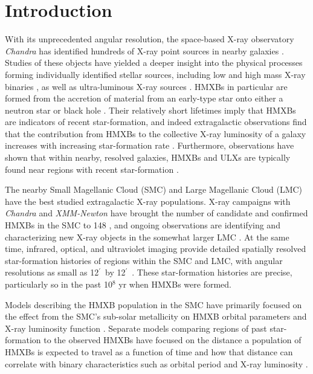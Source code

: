 \documentclass[usenatbib]{mnras}
\newcommand{\amin}{\ifmmode {^{\prime}\ }\else$^{\prime}$\fi}
\begin{document}
\section{Introduction}
With its unprecedented angular resolution, the space-based X-ray observatory {\it Chandra} has identified hundreds of X-ray point sources in nearby galaxies \citep{sarazin01,ho01,fabbiano01,fabbiano06}. Studies of these objects have yielded a deeper insight into the physical processes forming individually identified stellar sources, including low and high mass X-ray binaries \citep[LMXBs and HMXBs, respectively;][]{lehmer10}, as well as ultra-luminous X-ray sources \citep[ULX;][]{swartz04,feng11}. HMXBs in particular are formed from the accretion of material from an early-type star onto either a neutron star or black hole \citep[for a review, see][]{bhattacharya91}. Their relatively short lifetimes imply that HMXBs are indicators of recent star-formation, and indeed extragalactic observations find that the contribution from HMXBs to the collective X-ray luminosity of a galaxy increases with increasing star-formation rate \citep{grimm03,lehmer10,mineo12}. Furthermore, observations have shown that within nearby, resolved galaxies, HMXBs and ULXs are typically found near regions with recent star-formation \citep{zezas02a, kaaret04, antoniou10}.


The nearby Small Magellanic Cloud (SMC) and Large Magellanic Cloud (LMC) have the best studied extragalactic X-ray populations. X-ray campaigns with {\it Chandra} \citep[e.g.,][]{laycock10} and {\it XMM-Newton} \citep[e.g.,][]{sturm13} have brought the number of candidate and confirmed HMXBs in the SMC to 148 \citep[for the most recent catalog, see][]{haberl16}, and ongoing observations are identifying and characterizing new X-ray objects in the somewhat larger LMC \citep{antoniou16}. At the same time, infrared, optical, and ultraviolet imaging provide detailed spatially resolved star-formation histories of regions within the SMC and LMC, with angular resolutions as small as 12\amin\ by 12\amin\ \citep{harris04,harris09}. These star-formation histories are precise, particularly so in the past 10$^8$ yr when HMXBs were formed.


Models describing the HMXB population in the SMC have primarily focused on the effect from the SMC's sub-solar metallicity on HMXB orbital parameters \citep{dray06} and X-ray luminosity function \citep{linden10}. Separate models comparing regions of past star-formation to the observed HMXBs have focused on the distance a population of HMXBs is expected to travel as a function of time \citep{sepinsky05} and how that distance can correlate with binary characteristics such as orbital period and X-ray luminosity \citep{zuo10, zuo15}. 
\end{document}
